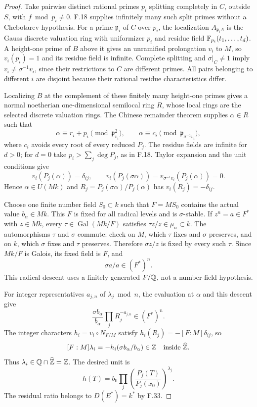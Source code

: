 \begin{proof}
Take pairwise distinct rational primes $p_i$ splitting
completely in $C$, outside $S$, with $f\bmod p_i\ne0$.
F.18 supplies infinitely many such split primes without a
Chebotarev hypothesis. For a prime $\mathfrak p_i$ of $C$
over $p_i$, the localization $A_{\mathfrak p_iA}$ is the
Gauss discrete valuation ring with uniformizer $p_i$ and
residue field $\mathbb F_{p_i}(t_1,\ldots,t_d)$. A height-one prime
of $B$ above it gives an unramified prolongation $v_i$ to $M$,
so $v_i(p_i)=1$ and its residue field is infinite.
Complete splitting and $\sigma|_C\ne1$ imply
$v_i\ne\sigma^{-1}v_i$, since their restrictions to $C$ are
different primes. All pairs belonging to different $i$ are
disjoint because their rational residue characteristics differ.

Localizing $B$ at the complement of these finitely many
height-one primes gives a normal noetherian one-dimensional
semilocal ring $R$, whose local rings are the selected discrete
valuation rings. The Chinese remainder theorem supplies
$\alpha\in R$ such that
\[
 \alpha\equiv r_i+p_i\pmod{\mathfrak p_{v_i}^2},\qquad
 \alpha\equiv c_i\pmod{\mathfrak p_{\sigma^{-1}v_i}},
\]
where $c_i$ avoids every root of every reduced $P_j$.
The residue fields are infinite for $d>0$; for $d=0$ take
$p_i>\sum_j\deg P_j$, as in F.18. Taylor expansion and the
unit conditions give
\[
 v_i(P_j(\alpha))=\delta_{ij},\qquad
 v_i(P_j(\sigma\alpha))
       =v_{\sigma^{-1}v_i}(P_j(\alpha))=0.
\]
Hence $\alpha\in U(Mk)$ and
$R_j=P_j(\sigma\alpha)/P_j(\alpha)$ has
$v_i(R_j)=-\delta_{ij}$.

Choose one finite number field $S_0\subset k$ such that
$F=MS_0$ contains the actual value $b_\alpha\in Mk$.
This $F$ is fixed for all radical levels and is $\sigma$-stable.
If $z^n=a\in F^*$ with $z\in Mk$, every
$\tau\in\operatorname{Gal}(Mk/F)$ satisfies
$\tau z/z\in\mu_n\subset k$. The automorphisms $\tau$ and
$\sigma$ commute: check on $M$, which $\tau$ fixes and
$\sigma$ preserves, and on $k$, which $\sigma$ fixes and
$\tau$ preserves. Therefore $\sigma z/z$ is fixed by every
such $\tau$. Since $Mk/F$ is Galois, its fixed field is $F$,
and
\[
 \sigma a/a\in(F^*)^n.
\]
This radical descent uses a finitely generated $F/\mathbb Q$, not a
number-field hypothesis.

For integer representatives $a_{j,n}$ of $\lambda_j\bmod n$,
the evaluation at $\alpha$ and this descent give
\[
 \frac{\sigma b_\alpha}{b_\alpha}
       \prod_jR_j^{-a_{j,n}}\in(F^*)^n.
\]
The integer characters $h_i=v_i\circ N_{F/M}$ satisfy
$h_i(R_j)=-[F:M]\delta_{ij}$, so
\[
 [F:M]\lambda_i=-h_i(\sigma b_\alpha/b_\alpha)\in\mathbb Z
 \quad\text{inside }\widehat{\mathbb Z}.
\]
Thus $\lambda_i\in\mathbb Q\cap\widehat{\mathbb Z}=\mathbb Z$. The desired unit is
\[
 h(T)=b_0\prod_j
       \left(\frac{P_j(T)}{P_j(x_0)}\right)^{\lambda_j}.
\]
The residual ratio belongs to $D(E^*)=k^*$ by F.33.
\end{proof}

